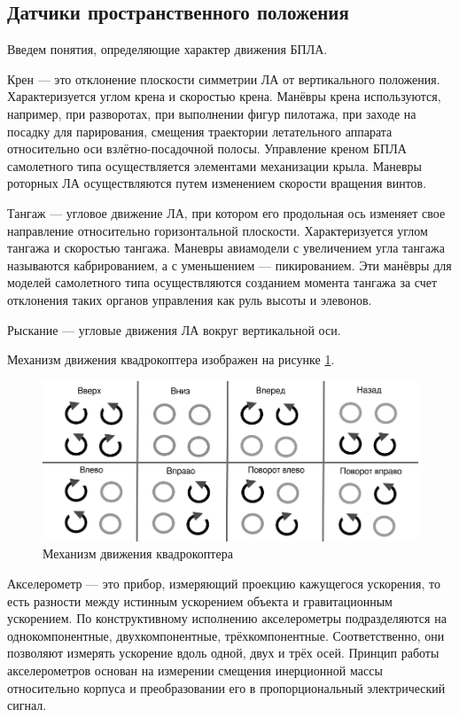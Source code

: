 \documentclass[pract, och, master]{SCWorks}
\begin{document}
\subsection*{Датчики пространственного положения}

Введем понятия, определяющие характер движения БПЛА.

Крен --- это отклонение плоскости симметрии ЛА от вертикального положения. 
Характеризуется углом крена и скоростью крена. Манёвры крена используются, например, при разворотах, при выполнении фигур пилотажа, при заходе на посадку 
для парирования, смещения траектории летательного аппарата относительно оси взлётно-посадочной полосы. Управление креном БПЛА самолетного типа 
осуществляется элементами механизации крыла. Маневры роторных ЛА осуществляются путем изменением скорости вращения винтов. 

Тангаж --- угловое движение ЛА, при котором его продольная ось изменяет свое направление относительно горизонтальной плоскости. Характеризуется углом тангажа 
и скоростью тангажа. Маневры авиамодели с увеличением угла тангажа называются кабрированием, а с уменьшением --- пикированием. Эти манёвры  для моделей самолетного 
типа осуществляются созданием момента тангажа за счет отклонения таких органов управления как руль высоты и элевонов. 

Рыскание --- угловые движения ЛА вокруг вертикальной оси.

Механизм движения квадрокоптера изображен на рисунке \ref{drone_run}.

\begin{figure}[!ht]
	\centering
	\includegraphics[width=14cm]{img/uavRun.png}
	\caption{\label{drone_run}%
	Механизм движения квадрокоптера}
\end{figure}


Акселерометр --- это прибор, измеряющий проекцию кажущегося ускорения, то есть разности между истинным ускорением объекта и гравитационным ускорением. 
По конструктивному исполнению акселерометры подразделяются на однокомпонентные, двухкомпонентные, трёхкомпонентные. Соответственно, они позволяют 
измерять ускорение вдоль одной, двух и трёх осей. Принцип работы акселерометров основан на измерении смещения инерционной массы относительно корпуса 
и преобразовании его в пропорциональный электрический сигнал.
\end{document}
